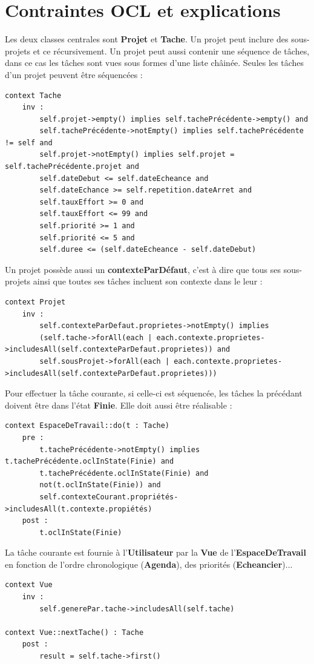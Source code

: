 \section{Contraintes OCL et explications}


	Les deux classes centrales sont \textbf{Projet} et \textbf{Tache}. Un projet peut inclure des sous-projets et ce récursivement. Un projet peut aussi contenir une séquence de tâches, dans ce cas les tâches sont vues sous formes d'une liste châinée. Seules les tâches d'un projet peuvent être séquencées :\\
\begin{lstlisting}
context Tache
	inv :
		self.projet->empty() implies self.tachePrécédente->empty() and
		self.tachePrécédente->notEmpty() implies self.tachePrécédente != self and
		self.projet->notEmpty() implies self.projet = self.tachePrécédente.projet and
		self.dateDebut <= self.dateEcheance and
		self.dateEchance >= self.repetition.dateArret and
		self.tauxEffort >= 0 and
		self.tauxEffort <= 99 and
		self.priorité >= 1 and
		self.priorité <= 5 and
		self.duree <= (self.dateEcheance - self.dateDebut)
\end{lstlisting}

	Un projet possède aussi un \textbf{contexteParDéfaut}, c'est à dire que tous ses sous-projets ainsi que toutes ses tâches incluent son contexte dans le leur :\\
\begin{lstlisting}
context Projet
	inv :
		self.contexteParDefaut.proprietes->notEmpty() implies
		(self.tache->forAll(each | each.contexte.proprietes->includesAll(self.contexteParDefaut.proprietes)) and
		self.sousProjet->forAll(each | each.contexte.proprietes->includesAll(self.contexteParDefaut.proprietes)))
\end{lstlisting}

	Pour effectuer la tâche courante, si celle-ci est séquencée, les tâches la précédant doivent être dans l'état \textbf{Finie}. Elle doit aussi être réalisable :\\
\begin{lstlisting}
context EspaceDeTravail::do(t : Tache)
	pre :
		t.tachePrécédente->notEmpty() implies t.tachePrécédente.oclInState(Finie) and
		t.tachePrécédente.oclInState(Finie) and
		not(t.oclInState(Finie)) and
		self.contexteCourant.propriétés->includesAll(t.contexte.propiétés)
	post :
		t.oclInState(Finie)
\end{lstlisting}

	La tâche courante est fournie à l'\textbf{Utilisateur} par la \textbf{Vue} de l'\textbf{EspaceDeTravail} en fonction de l'ordre chronologique (\textbf{Agenda}), des priorités (\textbf{Echeancier})...\\
\begin{lstlisting}
context Vue
	inv :
		self.generePar.tache->includesAll(self.tache)
		
context Vue::nextTache() : Tache
	post : 
		result = self.tache->first()
\end{lstlisting}

